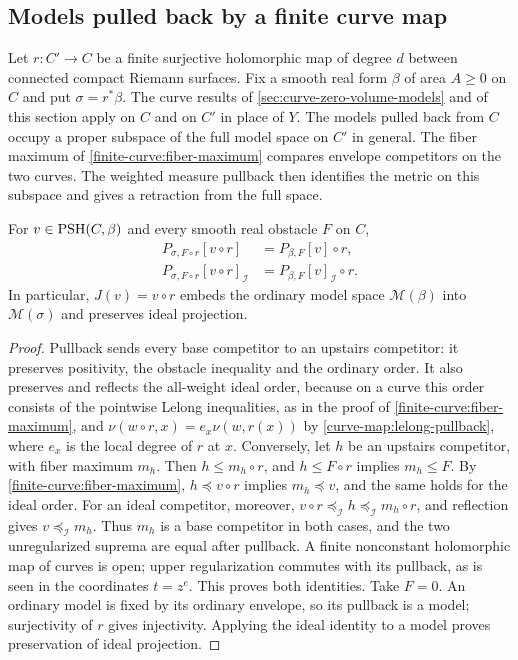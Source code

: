 \subsection{Models pulled back by a finite curve map}
\label{subsec:finite-curve-pullback-models}

Let $r\colon C'\to C$ be a finite surjective holomorphic map of
degree $d$ between connected compact Riemann surfaces. Fix a
smooth real form $\beta$ of area $A\geq0$ on $C$ and put
$\sigma=r^*\beta$. The curve results of
\cref{sec:curve-zero-volume-models} and of this section apply on
$C$ and on $C'$ in place of $Y$. The models pulled back
from $C$ occupy a proper subspace of the full model space on $C'$
in general.
The fiber maximum of \cref{finite-curve:fiber-maximum} compares
envelope competitors on the two curves. The weighted measure
pullback then identifies the metric on this subspace and gives
a retraction from the full space.

\begin{proposition}\label{finite-curve:envelope-pullback}
For $v\in\mathrm{PSH}(C,\beta)$ and every smooth real obstacle $F$ on $C$,
\[
 \begin{aligned}
 P_{\sigma,F\circ r}[v\circ r]
       &=P_{\beta,F}[v]\circ r,\\
 P_{\sigma,F\circ r}[v\circ r]_{\mathcal I}
       &=P_{\beta,F}[v]_{\mathcal I}\circ r.
 \end{aligned}
\]
In particular, $J(v)=v\circ r$ embeds the ordinary model space
$\mathcal M(\beta)$ into $\mathcal M(\sigma)$ and preserves
ideal projection.
\end{proposition}
\begin{proof}
Pullback sends every base competitor to an upstairs competitor:
it preserves positivity, the obstacle inequality and the ordinary
order. It also preserves and reflects the all-weight ideal order,
because on a curve this order consists of the pointwise Lelong
inequalities, as in the proof of \cref{finite-curve:fiber-maximum},
and $\nu(w\circ r,x)=e_x\nu(w,r(x))$ by
\cref{curve-map:lelong-pullback}, where $e_x$ is the local degree
of $r$ at $x$.
Conversely, let $h$ be an upstairs competitor, with fiber maximum
$m_h$. Then $h\leq m_h\circ r$, and $h\leq F\circ r$ implies
$m_h\leq F$. By \cref{finite-curve:fiber-maximum},
$h\preceq v\circ r$ implies $m_h\preceq v$, and the same holds
for the ideal order. For an ideal competitor, moreover,
$v\circ r\preceq_{\mathcal I}h\preceq_{\mathcal I}m_h\circ r$,
and reflection gives $v\preceq_{\mathcal I}m_h$. Thus $m_h$ is a
base competitor in both cases, and the two unregularized suprema
are equal after pullback.
A finite nonconstant holomorphic map of curves is open;
upper regularization commutes with its pullback, as is seen
in the coordinates $t=z^e$. This proves both identities.
Take $F=0$. An ordinary model is fixed by its ordinary
envelope, so its pullback is a model; surjectivity of $r$
gives injectivity. Applying the ideal identity to a model
proves preservation of ideal projection.
\end{proof}


